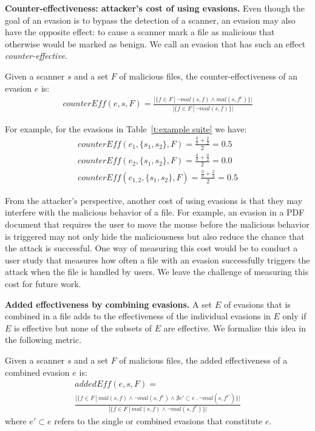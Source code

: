 \textbf{Counter-effectiveness: attacker's cost of using evasions.} Even though the goal of an evasion is to bypass the detection of a scanner, an evasion may also have the opposite effect: to cause a scanner mark a
file as malicious that otherwise would be marked as benign.
We call an evasion that has such an effect \emph{counter-effective}.

\begin{definition}
\label{def:counterEff}
Given a scanner $s$ and a set $F$ of malicious files, the counter-effectiveness of an evasion $e$ is:
\begin{multline*}
\mathit{counterEff}(e, s, F) =
\frac
{|\{ f \in F ~|~ \neg \mathit{mal}(s, f) \wedge \mathit{mal}(s, f^e) \}|}
{|\{ f \in F ~|~ \neg \mathit{mal}(s, f) \}|}
\end{multline*}
\end{definition}

For example, for the evasions in Table~\ref{t:example suite} we have:
\begin{gather*}
\mathit{counterEff}(e_1, \{s_1, s_2\}, F) = \frac{\frac{0}{0} + \frac{2}{2}}{2} = 0.5 \\
\mathit{counterEff}(e_2, \{s_1, s_2\}, F) = \frac{\frac{0}{0} + \frac{0}{2}}{2} = 0.0 \\
\mathit{counterEff}(e_{1,2}, \{s_1, s_2\}, F) = \frac{\frac{0}{0} + \frac{2}{2}}{2} = 0.5
\end{gather*}

From the attacker's perspective, another cost of using evasions is that they may interfere with the malicious behavior of a file.
For example, an evasion in a PDF document that requires the user to move the mouse before the malicious behavior is triggered may not only hide the maliciousness but also reduce the chance that the attack is successful.
One way of measuring this cost would be to conduct a user study that measures how often a file with an evasion successfully triggers the attack when the file is handled by users.
We leave the challenge of measuring this cost for future work.


\textbf{Added effectiveness by combining evasions.} A set $E$ of evasions that is combined in a file adds to the effectiveness of the individual evasions in $E$ only if $E$ is effective but none of the subsets of $E$ are effective.
We formalize this idea in the following metric.

\begin{definition}
Given a scanner $s$ and a set $F$ of malicious files, the added effectiveness of a combined evasion $e$ is:
\begin{multline*}
\mathit{addedEff}(e, s, F) =\\
\frac
{|\{ f \in F ~|~ \mathit{mal}(s,f) \wedge \neg \mathit{mal}(s,f^e) \wedge \nexists e' \subset e ~.~ \neg \mathit{mal}(s,f^{e'}) \}|}
{|\{ f \in F ~|~ \mathit{mal}(s,f) \wedge \neg \mathit{mal}(s,f^e) \}|}
\end{multline*}
where $e' \subset e$ refers to the single or combined evasions that constitute $e$.
\label{def: added eff}
\end{definition}

